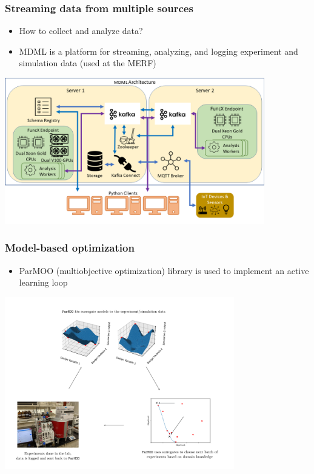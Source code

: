 \documentclass[aspectratio=169]{beamer}
\begin{document}
\begin{frame}
\frametitle{Streaming data from multiple sources}
  \begin{itemize}
  \item How to collect and analyze data?
  \item MDML is a platform for streaming, analyzing, and
  logging experiment and simulation data (used at the MERF)
  \end{itemize}
  \begin{center}
  \includegraphics[width=0.85\textwidth]{../../img/moo_new/MDML_arch_v2.png}
  \end{center}
\end{frame}

\begin{frame}
\frametitle{Model-based optimization}
  \begin{itemize}
  \item ParMOO (multiobjective optimization) library is used to implement an
  active learning loop
  \end{itemize}
  \begin{center}
  \includegraphics[width=0.75\textwidth]{../../img/moo_new/active-learning-loop.pdf}
  \end{center}
\end{frame}
\end{document}
